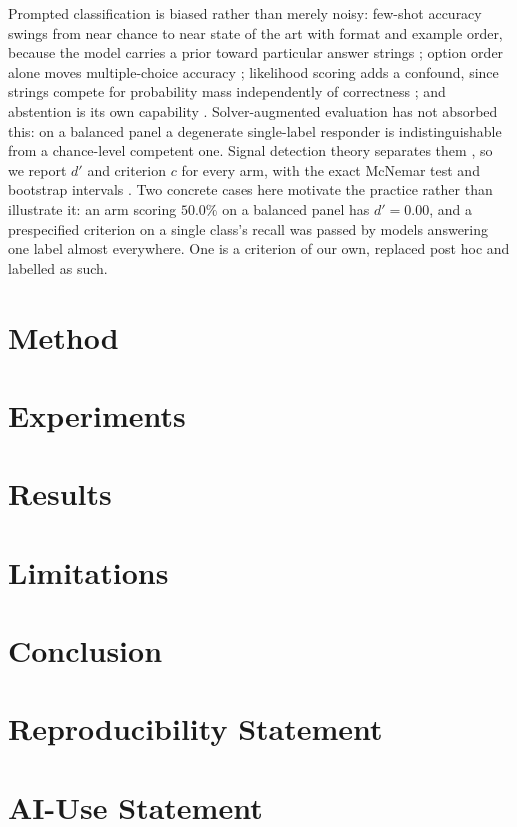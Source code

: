 \documentclass[10pt]{article}
\begin{document}
Prompted classification is biased rather than merely noisy: few-shot accuracy
swings from near chance to near state of the art with format and example order,
because the model carries a prior toward particular answer strings
\citep{zhao2021calibrate}; option order alone moves multiple-choice accuracy
\citep{pezeshkpour2023large,zheng2023large}; likelihood scoring adds a confound,
since strings compete for probability mass independently of correctness
\citep{holtzman2021surface}; and abstention is its own capability
\citep{kadavath2022language,yin2023large}. Solver-augmented evaluation has not absorbed this: on a balanced panel a
degenerate single-label responder is indistinguishable from a chance-level
competent one. Signal detection theory separates them
\citep{macmillan1991detection,stanislaw1999calculation}, so we report $d'$ and
criterion $c$ for every arm, with the exact McNemar test \citep{mcnemar1947note}
and bootstrap intervals \citep{efron1987better}. Two concrete cases here motivate the practice
rather than illustrate it: an arm scoring $50.0\%$ on a balanced panel has
$d' = 0.00$, and a prespecified criterion on a single class's recall was passed by
models answering one label almost everywhere. One is a criterion of our own,
replaced post hoc and labelled as such.

\section{Method}
\section{Experiments}
\section{Results}
\section{Limitations}
\section{Conclusion}

\section*{Reproducibility Statement}

\section*{AI-Use Statement}



\end{document}

